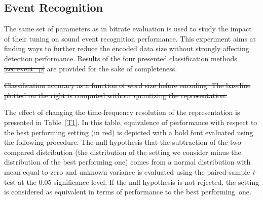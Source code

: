 \documentclass[sensors,article,accept,moreauthors,pdftex,10pt,a4paper]{mdpi}
\providecommand{\DIFaddtex}[1]{{\protect\color{blue}\uwave{#1}}} %
\providecommand{\DIFdeltex}[1]{{\protect\color{red}\sout{#1}}}                      %
\providecommand{\DIFaddbegin}{} %
\providecommand{\DIFaddend}{} %
\providecommand{\DIFdelbegin}{} %
\providecommand{\DIFdelend}{} %
\providecommand{\DIFdelFL}[1]{\DIFdel{#1}} %
\providecommand{\DIFadd}[1]{\texorpdfstring{\DIFaddtex{#1}}{#1}} %
\providecommand{\DIFdel}[1]{\texorpdfstring{\DIFdeltex{#1}}{}} %
\begin{document}
\subsection{Event Recognition} \label{sec:event_r}

The same set of parameters as in bitrate evaluation is used to study the impact of their tuning on sound event recognition performance. This experiment aims at finding ways to further reduce the encoded data size without strongly affecting detection performance. Results of the four presented classification methods \DIFdelbegin %
\DIFdel{\ref{sec:event_p}}\DIFdelend \DIFaddbegin \DIFadd{(}{\DIFadd{Section}} \DIFadd{\ref{sec:event_p}) }\DIFaddend are provided for the sake of completeness.%

\DIFdelbegin %

{%
\DIFdelFL{Classification accuracy as a function of word size before encoding. The baseline plotted on the right is computed without quantizing the representation.}}

\DIFdelend The effect of changing the time-frequency resolution of the representation is presented in Table~\ref{T1}. In this table, equivalence of performance with respect to the best performing setting (in red) is depicted with a bold font evaluated using the following procedure. The null hypothesis that the subtraction of the two compared distribution (the distribution of the setting we consider minus the distribution of the best performing one) comes from a normal distribution with mean equal to zero and unknown variance is evaluated using the paired-sample \emph{t}-test at the 0.05 significance level. If the null hypothesis is not rejected, the setting is considered as equivalent in terms of performance to the best \mbox{performing one.}
\end{document}
